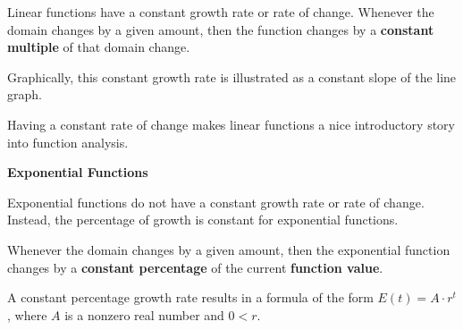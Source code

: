 \documentclass{ximera}
\begin{document}
Linear functions have a constant growth rate or rate of change.  Whenever the domain changes by a given amount, then the function changes by a \textbf{\textcolor{purple!85!blue}{constant multiple}} of that domain change. 

Graphically, this constant growth rate is illustrated as a constant slope of the line graph.

Having a constant rate of change makes linear functions a nice introductory story into function analysis.  




\textbf{\textcolor{blue!55!black}{Exponential Functions}}


Exponential functions do not have a constant growth rate or rate of change. Instead, the percentage of growth is constant for exponential functions.


Whenever the domain changes by a given amount, then the exponential function changes by a \textbf{\textcolor{blue!55!black}{constant percentage}} of the current \textbf{\textcolor{blue!55!black}{function value}}.  

A constant percentage growth rate results in a formula of the form $E(t) = A \cdot r^t$, where $A$ is a nonzero real number and $0 < r$. 
\end{document}
